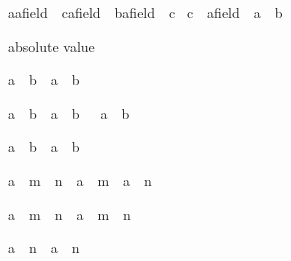 \begin{isabellebody}
\begin{isamarkuptext}
\begin{isabelle}%
{\isacharparenleft}{\isacharparenleft}a{\isasymColon}{\isacharprime}a{\isasymColon}field{\isacharparenright}\ {\isacharasterisk}\ {\isacharparenleft}c{\isasymColon}{\isacharprime}a{\isasymColon}field{\isacharparenright}\ {\isacharequal}\ {\isacharparenleft}b{\isasymColon}{\isacharprime}a{\isasymColon}field{\isacharparenright}\ {\isacharasterisk}\ c{\isacharparenright}\ {\isacharequal}\isanewline
{\isacharparenleft}c\ {\isacharequal}\ {\isacharparenleft}{}{\isasymColon}{\isacharprime}a{\isasymColon}field{\isacharparenright}\ {\isasymor}\ a\ {\isacharequal}\ b{\isacharparenright}%
\end{isabelle}
%
\end{isamarkuptext}%
\isamarkuptrue%
\isamarkupfalse%
%
\begin{isamarkuptext}%
absolute value

\begin{isabelle}%
{\isasymbar}a\ {\isacharasterisk}\ b{\isasymbar}\ {\isacharequal}\ {\isasymbar}a{\isasymbar}\ {\isacharasterisk}\ {\isasymbar}b{\isasymbar}%
\end{isabelle}

\begin{isabelle}%
{\isacharparenleft}{\isasymbar}a{\isasymbar}\ {\isasymle}\ b{\isacharparenright}\ {\isacharequal}\ {\isacharparenleft}a\ {\isasymle}\ b\ {\isasymand}\ {\isacharminus}\ a\ {\isasymle}\ b{\isacharparenright}%
\end{isabelle}

\begin{isabelle}%
{\isasymbar}a\ {\isacharplus}\ b{\isasymbar}\ {\isasymle}\ {\isasymbar}a{\isasymbar}\ {\isacharplus}\ {\isasymbar}b{\isasymbar}%
\end{isabelle}

\begin{isabelle}%
a\ {\isacharcircum}\ {\isacharparenleft}m\ {\isacharplus}\ n{\isacharparenright}\ {\isacharequal}\ a\ {\isacharcircum}\ m\ {\isacharasterisk}\ a\ {\isacharcircum}\ n%
\end{isabelle}

\begin{isabelle}%
a\ {\isacharcircum}\ {\isacharparenleft}m\ {\isacharasterisk}\ n{\isacharparenright}\ {\isacharequal}\ {\isacharparenleft}a\ {\isacharcircum}\ m{\isacharparenright}\ {\isacharcircum}\ n%
\end{isabelle}

\begin{isabelle}%
{\isasymbar}a\ {\isacharcircum}\ n{\isasymbar}\ {\isacharequal}\ {\isasymbar}a{\isasymbar}\ {\isacharcircum}\ n%
\end{isabelle}
%
\end{isamarkuptext}%
\isamarkuptrue%
\isanewline
\isamarkupfalse%
\end{isabellebody}%
